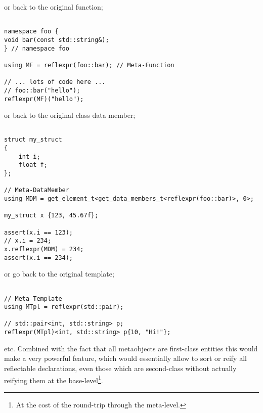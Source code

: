 or back to the original function;

\begin{verbatim}

namespace foo {
void bar(const std::string&);
} // namespace foo

using MF = reflexpr(foo::bar); // Meta-Function

// ... lots of code here ...
// foo::bar("hello");
reflexpr(MF)("hello");

\end{verbatim}

or back to the original class data member;

\begin{verbatim}

struct my_struct
{
	int i;
	float f;
};

// Meta-DataMember
using MDM = get_element_t<get_data_members_t<reflexpr(foo::bar)>, 0>;

my_struct x {123, 45.67f};

assert(x.i == 123);
// x.i = 234;
x.reflexpr(MDM) = 234;
assert(x.i == 234);

\end{verbatim}

or go back to the original template;

\begin{verbatim}

// Meta-Template
using MTpl = reflexpr(std::pair);

// std::pair<int, std::string> p;
reflexpr(MTpl)<int, std::string> p{10, "Hi!"};

\end{verbatim}

etc.
Combined with the fact that all metaobjects are first-class
entities this would make a very powerful feature, which would essentially
allow to sort or reify all reflectable declarations, even those which are
second-class without actually reifying them at the base-level\footnote{
At the cost of the round-trip through the meta-level.}.
